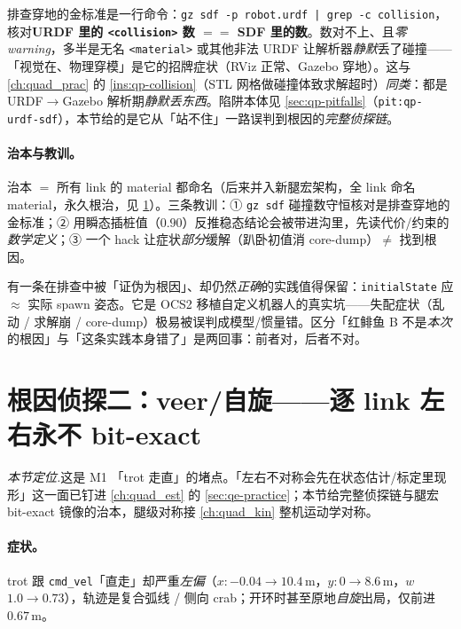 \begin{insight}\label{ins:qadv-collision-conserve}
排查穿地的金标准是一行命令：\texttt{gz sdf -p robot.urdf | grep -c collision}，核对\textbf{URDF 里的 \texttt{<collision>} 数 $==$ SDF 里的数}。数对不上、且\emph{零 warning}，多半是无名 \texttt{<material>} 或其他非法 URDF 让解析器\emph{静默}丢了碰撞——「视觉在、物理穿模」是它的招牌症状（RViz 正常、Gazebo 穿地）。这与 \cref{ch:quad_prac} 的 \cref{ins:qp-collision}（STL 网格做碰撞体致求解超时）\emph{同类}：都是 URDF$\to$Gazebo 解析期\emph{静默丢东西}。陷阱本体见 \cref{sec:qp-pitfalls}（\texttt{pit:qp-urdf-sdf}），本节给的是它从「站不住」一路误判到根因的\emph{完整侦探链}。
\end{insight}

\paragraph{治本与教训。}
治本 $=$ 所有 link 的 material 都命名（后来并入新腿宏架构，全 link 命名 material，永久根治，见 \cref{sec:qadv-rc2}）。三条教训：① \texttt{gz sdf} 碰撞数守恒核对是排查穿地的金标准；② 用瞬态插桩值（$0.90$）反推稳态结论会被带进沟里，先读代价/约束的\emph{数学定义}；③ 一个 hack 让症状\emph{部分}缓解（趴卧初值消 core-dump）$\neq$ 找到根因。

\begin{note}
有一条在排查中被「证伪为根因」、却仍然\emph{正确}的实践值得保留：\texttt{initialState} 应 $\approx$ 实际 spawn 姿态。它是 OCS2 移植自定义机器人的真实坑——失配症状（乱动 / 求解崩 / core-dump）极易被误判成模型/惯量错。区分「红鲱鱼 B 不是\emph{本次}的根因」与「这条实践本身错了」是两回事：前者对，后者不对。
\end{note}

\section{根因侦探二：veer/自旋——逐 link 左右永不 bit-exact}
\label{sec:qadv-rc2}

\noindent\emph{本节定位.}\;这是 M1 「trot 走直」的堵点。「左右不对称会先在状态估计/标定里现形」这一面已钉进 \cref{ch:quad_est} 的 \cref{sec:qe-practice}；本节给完整侦探链与腿宏 bit-exact 镜像的治本，腿级对称接 \cref{ch:quad_kin} 整机运动学对称。

\paragraph{症状。}
trot 跟 \texttt{cmd\_vel}「直走」却严重\emph{左偏}（$x{:}{-}0.04\to10.4$\,m，$y{:}0\to8.6$\,m，$w$ $1.0\to0.73$），轨迹是复合弧线 / 侧向 crab；开环时甚至原地\emph{自旋}出局，仅前进 $0.67$\,m。

